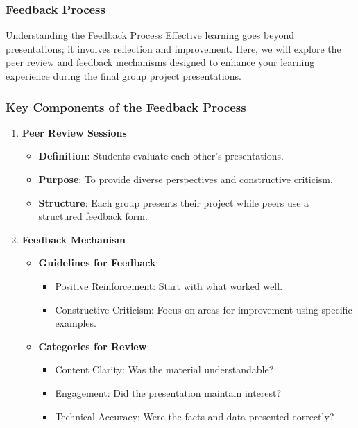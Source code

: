 \documentclass[aspectratio=169]{beamer}
\begin{document}
\begin{frame}[fragile]
    \frametitle{Feedback Process}
    \begin{block}{Understanding the Feedback Process}
        Effective learning goes beyond presentations; it involves reflection and improvement. Here, we will explore the peer review and feedback mechanisms designed to enhance your learning experience during the final group project presentations.
    \end{block}
\end{frame}

\begin{frame}[fragile]
    \frametitle{Key Components of the Feedback Process}
    \begin{enumerate}
        \item \textbf{Peer Review Sessions}
        \begin{itemize}
            \item \textbf{Definition}: Students evaluate each other’s presentations.
            \item \textbf{Purpose}: To provide diverse perspectives and constructive criticism.
            \item \textbf{Structure}: Each group presents their project while peers use a structured feedback form.
        \end{itemize}

        \item \textbf{Feedback Mechanism}
        \begin{itemize}
            \item \textbf{Guidelines for Feedback}:
            \begin{itemize}
                \item Positive Reinforcement: Start with what worked well.
                \item Constructive Criticism: Focus on areas for improvement using specific examples.
            \end{itemize}
            \item \textbf{Categories for Review}:
            \begin{itemize}
                \item Content Clarity: Was the material understandable?
                \item Engagement: Did the presentation maintain interest?
                \item Technical Accuracy: Were the facts and data presented correctly?
            \end{itemize}
        \end{itemize}
    \end{enumerate}
\end{frame}
\end{document}
